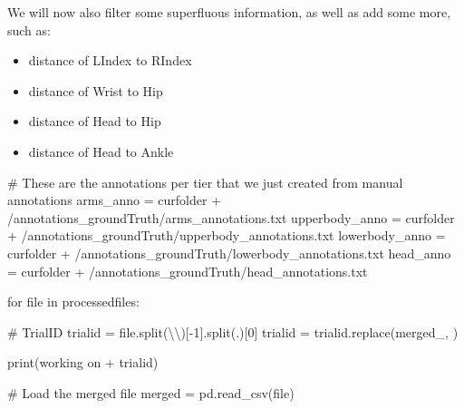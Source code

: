 \documentclass[
  letterpaper,
  DIV=11,
  numbers=noendperiod]{scrreprt}
\newenvironment{Shaded}{\begin{snugshade}}{\end{snugshade}}
\newcommand{\BuiltInTok}[1]{\textcolor[rgb]{0.00,0.23,0.31}{#1}}
\newcommand{\CharTok}[1]{\textcolor[rgb]{0.13,0.47,0.30}{#1}}
\newcommand{\CommentTok}[1]{\textcolor[rgb]{0.37,0.37,0.37}{#1}}
\newcommand{\ControlFlowTok}[1]{\textcolor[rgb]{0.00,0.23,0.31}{#1}}
\newcommand{\DecValTok}[1]{\textcolor[rgb]{0.68,0.00,0.00}{#1}}
\newcommand{\KeywordTok}[1]{\textcolor[rgb]{0.00,0.23,0.31}{#1}}
\newcommand{\NormalTok}[1]{\textcolor[rgb]{0.00,0.23,0.31}{#1}}
\newcommand{\OperatorTok}[1]{\textcolor[rgb]{0.37,0.37,0.37}{#1}}
\newcommand{\StringTok}[1]{\textcolor[rgb]{0.13,0.47,0.30}{#1}}
\providecommand{\tightlist}{%
  \setlength{\itemsep}{0pt}\setlength{\parskip}{0pt}}\usepackage{longtable,booktabs,array}
\begin{document}
We will now also filter some superfluous information, as well as add
some more, such as:

\begin{itemize}
\tightlist
\item
  distance of LIndex to RIndex
\item
  distance of Wrist to Hip
\item
  distance of Head to Hip
\item
  distance of Head to Ankle
\end{itemize}

\begin{Shaded}
\begin{Highlighting}[]
\CommentTok{\# These are the annotations per tier that we just created from manual annotations}
\NormalTok{arms\_anno }\OperatorTok{=}\NormalTok{ curfolder }\OperatorTok{+} \StringTok{\textquotesingle{}/annotations\_groundTruth/arms\_annotations.txt\textquotesingle{}}
\NormalTok{upperbody\_anno }\OperatorTok{=}\NormalTok{ curfolder }\OperatorTok{+} \StringTok{\textquotesingle{}/annotations\_groundTruth/upperbody\_annotations.txt\textquotesingle{}}
\NormalTok{lowerbody\_anno }\OperatorTok{=}\NormalTok{ curfolder }\OperatorTok{+} \StringTok{\textquotesingle{}/annotations\_groundTruth/lowerbody\_annotations.txt\textquotesingle{}}
\NormalTok{head\_anno }\OperatorTok{=}\NormalTok{ curfolder }\OperatorTok{+} \StringTok{\textquotesingle{}/annotations\_groundTruth/head\_annotations.txt\textquotesingle{}}

\ControlFlowTok{for} \BuiltInTok{file} \KeywordTok{in}\NormalTok{ processedfiles:}

    \CommentTok{\# TrialID}
\NormalTok{    trialid }\OperatorTok{=} \BuiltInTok{file}\NormalTok{.split(}\StringTok{\textquotesingle{}}\CharTok{\textbackslash{}\textbackslash{}}\StringTok{\textquotesingle{}}\NormalTok{)[}\OperatorTok{{-}}\DecValTok{1}\NormalTok{].split(}\StringTok{\textquotesingle{}.\textquotesingle{}}\NormalTok{)[}\DecValTok{0}\NormalTok{]}
\NormalTok{    trialid }\OperatorTok{=}\NormalTok{ trialid.replace(}\StringTok{\textquotesingle{}merged\_\textquotesingle{}}\NormalTok{, }\StringTok{\textquotesingle{}\textquotesingle{}}\NormalTok{)}

    \BuiltInTok{print}\NormalTok{(}\StringTok{\textquotesingle{}working on \textquotesingle{}} \OperatorTok{+}\NormalTok{ trialid)}

    \CommentTok{\# Load the merged file}
\NormalTok{    merged }\OperatorTok{=}\NormalTok{ pd.read\_csv(}\BuiltInTok{file}\NormalTok{)}
    

\end{Highlighting}
\end{Shaded}
\end{document}
